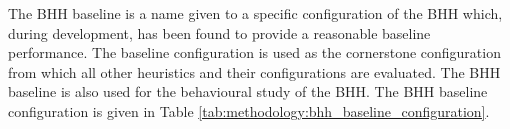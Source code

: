 The \acs{BHH} baseline is a name given to a specific configuration of the \acs{BHH} which, during development, has been found to provide a reasonable baseline performance. The baseline configuration is used as the cornerstone configuration from which all other heuristics and their configurations are evaluated. The \acs{BHH} baseline is also used for the behavioural study of the \acs{BHH}. The \acs{BHH} baseline configuration is given in Table \ref{tab:methodology:bhh_baseline_configuration}.

\begin{table}[htb]
      \centering
      \caption{The \acs{BHH} baseline configuration as it is used in the empirical study.}
      \label{tab:methodology:bhh_baseline_configuration}%
      \par\bigskip
\end{table}%

